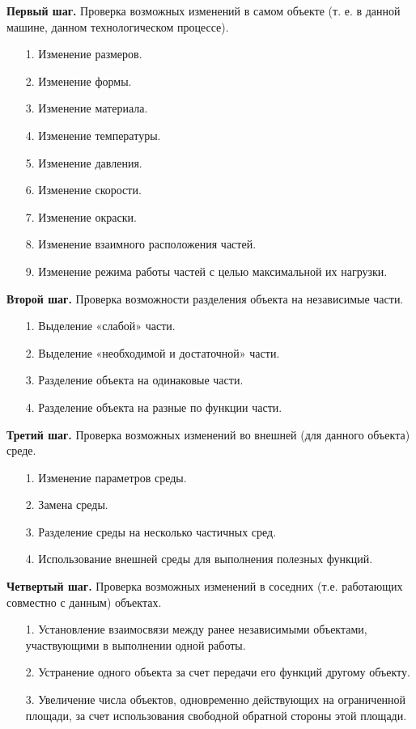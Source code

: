 \documentclass[11pt,a4paper]{article}
\begin{document}
\textbf{Первый шаг.} Проверка возможных изменений в самом объекте (т. е. в
данной машине, данном технологическом процессе).
\begin{itemize}
\item[1.] Изменение размеров.
\item[2.] Изменение формы.
\item[3.] Изменение материала.
\item[4.] Изменение температуры.
\item[5.] Изменение давления.
\item[6.] Изменение скорости.
\item[7.] Изменение окраски.
\item[8.] Изменение взаимного расположения частей.
\item[9.] Изменение режима работы частей с целью максимальной их нагрузки.
\end{itemize}
\textbf{Второй шаг.} Проверка возможности разделения объекта на независимые
части.
\begin{itemize}
\item[1.] Выделение «слабой» части.
\item[2.] Выделение «необходимой и достаточной» части.
\item[3.] Разделение объекта на одинаковые части.
\item[4.] Разделение объекта на разные по функции части.
\end{itemize}
\textbf{Третий шаг.} Проверка возможных изменений во внешней (для данного
объекта) среде.
\begin{itemize}
\item[1.] Изменение параметров среды.
\item[2.] Замена среды.
\item[3.] Разделение среды на несколько частичных сред.
\item[4.] Использование внешней среды для выполнения полезных функций.
\end{itemize}
\textbf{Четвертый шаг.} Проверка возможных изменений в соседних
(т.е. работающих совместно с данным) объектах.
\begin{itemize}
\item[1.] Установление взаимосвязи между ранее независимыми объектами,
  участвующими в выполнении одной работы.
\item[2.] Устранение одного объекта за счет передачи его функций другому
  объекту.
\item[3.] Увеличение числа объектов, одновременно действующих на ограниченной
  площади, за счет использования свободной обратной стороны этой площади.
\end{itemize}
\end{document}
